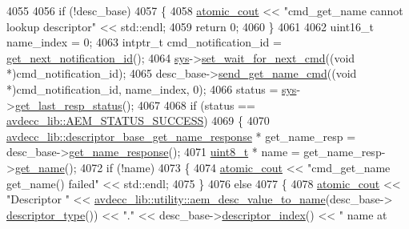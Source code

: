 \begin{DoxyCode}
4055 
4056     \textcolor{keywordflow}{if} (!desc\_base)
4057     \{
4058         \hyperlink{cmd__line_8h_a0bc38ccc65c79ba06c6fcd7b4bf554c3}{atomic\_cout} << \textcolor{stringliteral}{"cmd\_get\_name cannot lookup descriptor"} << std::endl;
4059         \textcolor{keywordflow}{return} 0;
4060     \}
4061 
4062     uint16\_t name\_index = 0;
4063     intptr\_t cmd\_notification\_id = \hyperlink{classcmd__line_a57486218387d1aa9d262eb7c176154ad}{get\_next\_notification\_id}();
4064     \hyperlink{classcmd__line_a485db4800e331cb4052c447fdf5d154e}{sys}->\hyperlink{classavdecc__lib_1_1system_a26b769584f10225077da47583edda33e}{set\_wait\_for\_next\_cmd}((\textcolor{keywordtype}{void} *)cmd\_notification\_id);
4065     desc\_base->\hyperlink{classavdecc__lib_1_1descriptor__base_a27ba9959456de53a8de18eead74806f7}{send\_get\_name\_cmd}((\textcolor{keywordtype}{void} *)cmd\_notification\_id, name\_index, 0);
4066     status = \hyperlink{classcmd__line_a485db4800e331cb4052c447fdf5d154e}{sys}->\hyperlink{classavdecc__lib_1_1system_aa63e8d1a4e51f695cdcccc9340922407}{get\_last\_resp\_status}();
4067 
4068     \textcolor{keywordflow}{if} (status == \hyperlink{namespaceavdecc__lib_affd436edb2cecd20cfd784a84f852b2bac947077909cb590b84f4b5db413080e0}{avdecc\_lib::AEM\_STATUS\_SUCCESS})
4069     \{
4070         \hyperlink{classavdecc__lib_1_1descriptor__base__get__name__response}{avdecc\_lib::descriptor\_base\_get\_name\_response} * 
      get\_name\_resp = desc\_base->\hyperlink{classavdecc__lib_1_1descriptor__base_aba4bf8a81f90f5bf00d5c8b5a7330145}{get\_name\_response}();
4071         \hyperlink{stdint_8h_aba7bc1797add20fe3efdf37ced1182c5}{uint8\_t} * name = get\_name\_resp->\hyperlink{classavdecc__lib_1_1descriptor__base__get__name__response_a8d13dc83e2fca08ad67c1218a0501081}{get\_name}();
4072         \textcolor{keywordflow}{if} (!name)
4073         \{
4074             \hyperlink{cmd__line_8h_a0bc38ccc65c79ba06c6fcd7b4bf554c3}{atomic\_cout} << \textcolor{stringliteral}{"cmd\_get\_name get\_name() failed"} << std::endl;
4075         \}
4076         \textcolor{keywordflow}{else}
4077         \{
4078             \hyperlink{cmd__line_8h_a0bc38ccc65c79ba06c6fcd7b4bf554c3}{atomic\_cout} << \textcolor{stringliteral}{"Descriptor "} << 
      \hyperlink{namespaceavdecc__lib_1_1utility_a6bdd02679e5a911a071d4aa03be341f0}{avdecc\_lib::utility::aem\_desc\_value\_to\_name}(desc\_base->
      \hyperlink{classavdecc__lib_1_1descriptor__base_a5112b70022171063ec5d3242bee9910e}{descriptor\_type}()) << \textcolor{stringliteral}{"."} << desc\_base->\hyperlink{classavdecc__lib_1_1descriptor__base_a7eed5583bffdf72d89021b188648c1b5}{descriptor\_index}() << \textcolor{stringliteral}{" name at
}
\end{DoxyCode}
